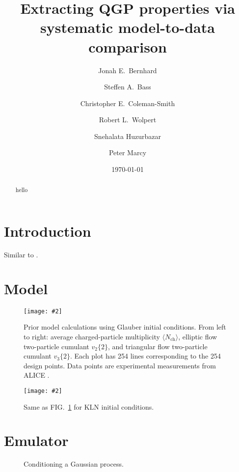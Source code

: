 \documentclass[aps, prc, reprint, amsmath]{revtex4-1}
\newcommand{\widefig}[3][t]{
  \begin{figure*}[#1]
    \texttt{[image: \#2]}
    \caption{\label{fig:#2}#3}
  \end{figure*}
}
\newcommand{\placeholderfig}[3][t]{
  \begin{figure}[#1]
    \centering
    \framebox{\parbox[c][.5\columnwidth]{\columnwidth}{
      placeholder
    }}
    \caption{\label{fig:#2}#3}
  \end{figure}
}
\newcommand{\avg}[1]{\langle #1 \rangle}
\newcommand{\nch}{N_\text{ch}}
\newcommand{\vnk}[2]{v_#1\{#2\}}
\begin{document}
\title{Extracting QGP properties via systematic model-to-data comparison}

\author{Jonah E.\ Bernhard}
\author{Steffen A.\ Bass}
\author{Christopher E.\ Coleman-Smith}
\author{Robert L.\ Wolpert}

\author{Snehalata Huzurbazar}

\author{Peter Marcy}


\date{\today}

\begin{abstract}
  hello
\end{abstract}

\maketitle


\section{Introduction}

Similar to \cite{pratt-mtd, soltz-mtd}.


\section{Model}

\cite{bass-dumitru, nonaka-bass, song}
\cite{glauber}
\cite{kln}
\cite{vish}
\cite{cooper-frye}
\cite{iss}
\cite{urqmd1, urqmd2}
\cite{iebe}

\widefig{prior_draws_glb}{
  Prior model calculations using Glauber initial conditions.
  From left to right:
  average charged-particle multiplicity $\avg\nch$,
  elliptic flow two-particle cumulant $\vnk 2 2$,
  and triangular flow two-particle cumulant $\vnk 3 2$.
  Each plot has 254 lines corresponding to the 254 design points.
  Data points are experimental measurements from ALICE \cite{alice-cumulants}.
}

\widefig{prior_draws_kln}{
  Same as FIG.~\ref{fig:prior_draws_glb} for KLN initial conditions.
}


\section{Emulator}

\cite{gpml}
\cite{ohagan, higdon2008, higdon2014}

\placeholderfig{gp}{
  Conditioning a Gaussian process.
}
\end{document}
